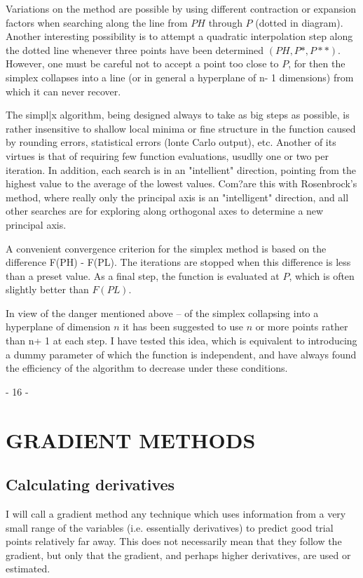      Variations on the method are possible by using different contraction
or expansion factors when searching along the line from $PH$ through $P$
(dotted in diagram).  Another interesting possibility is to attempt a
quadratic interpolation step along the dotted line whenever three points
have been determined $(PH, P*, P**)$.  However, one must be careful not to
accept a point too close to $P$, for then the simplex collapses into a line
(or in general a hyperplane of n- 1 dimensions) from which it can never
recover.
 
     The simpl|x algorithm, being designed always to take as big steps
as possible, is rather insensitive to shallow local minima or fine
structure in the function caused by rounding errors, statistical errors
(lonte Carlo output), etc.  Another of its virtues is that of requiring
few function evaluations, usudlly one or two per iteration.  In addition,
each search is in an "intellient" direction, pointing from the highest
value to the average of the lowest values.  Com?are this with Rosenbrock's
method, where really only the principal axis is an "intelligent" direction,
and all other searches are for exploring along orthogonal axes to
determine a new principal axis.
 
     A convenient convergence criterion for the simplex method is based
on the difference F(PH) - F(PL).  The iterations are stopped when this
difference is less than a preset value.  As a final step, the function is
evaluated at $P$, which is often slightly better than $F(PL)$.
 
     In view of the danger mentioned above -- of the simplex collapsing
into a hyperplane of dimension $n      $ it has been suggested to use $n $
or more points rather than n+ 1 at each step.  I have tested this idea,
which is equivalent to introducing a dummy parameter of which the
function is independent, and have always found the efficiency of the
algorithm to decrease under these conditions.
 
                                 - 16 -
\chapter{GRADIENT METHODS}
 
\section{Calculating derivatives}
 
     I will call a gradient method any technique which uses information
from a very small range of the variables (i.e. essentially derivatives)
to predict good trial points relatively far away. This does not necessarily
 mean that they follow the gradient, but only that the gradient, and
perhaps higher derivatives, are used or estimated.
 
